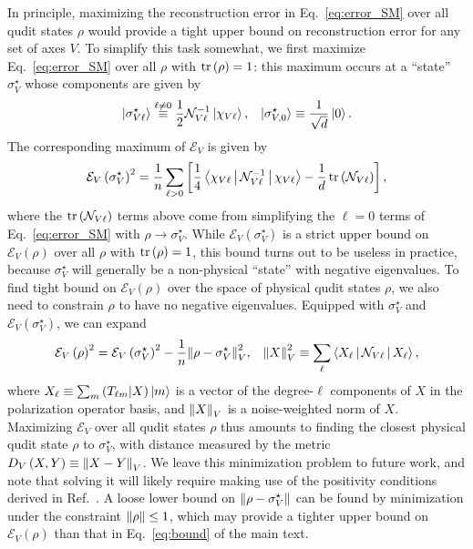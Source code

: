 \documentclass[a4paper,twocolumn,unpublished]{quantumarticle}
\newcommand{\f}[2]{\dfrac{#1}{#2}} %
\newcommand{\p}[1]{\left(#1\right)} %
\renewcommand{\sp}[1]{\left[#1\right]} %
\newcommand{\bk}{\Braket} %
\newcommand{\E}{\mathcal{E}}
\newcommand{\N}{\mathcal{N}}
\def\obk#1{\mathinner{({#1})}}
\begin{document}
In principle, maximizing the reconstruction error in Eq.~\eqref{eq:error_SM} over all qudit states $\rho$ would provide a tight upper bound on reconstruction error for any set of axes $V$.
To simplify this task somewhat, we first maximize Eq.~\eqref{eq:error_SM} over all $\rho$ with $\tr\p\rho=1$: this maximum occurs at a ``state'' $\sigma_V^\star$ whose components are given by
\begin{align}
  \ket{\sigma_{V\ell}^\star} \stackrel{\ell\ne0}{\equiv}
  \f12 \N_{V\ell}^{-1} \ket{\chi_{V\ell}},
  &&
  \ket{\sigma_{V,0}^\star} \equiv \f1{\sqrt{d}} \ket{0}.
\end{align}
The corresponding maximum of $\E_V$ is given by
\begin{align}
  \E_V\p{\sigma_V^\star}^2 = \f1n \sum_{\ell>0}
  \sp{\f14 \bk{\chi_{V\ell}|\N_{V\ell}^{-1}|\chi_{V\ell}}
  - \f1d \tr\p{\N_{V\ell}}},
\end{align}
where the $\tr\p{\N_{V\ell}}$ terms above come from simplifying the $\ell=0$ terms of Eq.~\eqref{eq:error_SM} with $\rho\to\sigma_V^\star$.
While $\E_V\p{\sigma_V^\star}$ is a strict upper bound on $\E_V\p{\rho}$ over all $\rho$ with $\tr\p{\rho}=1$, this bound turns out to be useless in practice, because $\sigma_V^\star$ will generally be a non-physical ``state'' with negative eigenvalues.
To find tight bound on $\E_V\p{\rho}$ over the space of physical qudit states $\rho$, we also need to constrain $\rho$ to have no negative eigenvalues.
Equipped with $\sigma_V^\star$ and $\E_V\p{\sigma_V^\star}$, we can expand
\begin{align}
  \E_V\p{\rho}^2 = \E_V\p{\sigma_V^\star}^2
  - \f1n \norm{\rho-\sigma_V^\star}_V^2,
  &&
  \norm{X}_V^2 \equiv \sum_\ell \bk{X_\ell|\N_{V\ell}|X_\ell},
\end{align}
where $X_\ell\equiv\sum_m\obk{T_{\ell m}|X}\ket{m}$ is a vector of the degree-$\ell$ components of $X$ in the polarization operator basis, and $\norm{X}_V$ is a noise-weighted norm of $X$.
Maximizing $\E_V$ over all qudit states $\rho$ thus amounts to finding the closest physical qudit state $\rho$ to $\sigma_V^\star$, with distance measured by the metric $D_V\p{X,Y}\equiv\norm{X-Y}_V$.
We leave this minimization problem to future work, and note that solving it will likely require making use of the positivity conditions derived in Ref.~\cite{kryszewski2006positivity}.
A loose lower bound on $\norm{\rho-\sigma_V^\star}$ can be found by minimization under the constraint $\norm{\rho}\le1$, which may provide a tighter upper bound on $\E_V\p{\rho}$ than that in Eq.~\eqref{eq:bound} of the main text.
\end{document}
